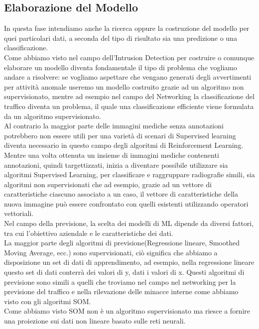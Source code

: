 \documentclass[../tesi.tex]{subfiles}
\begin{document}
\subsection{Elaborazione del Modello}
In questa fase intendiamo anche la ricerca oppure la costruzione del modello per quei particolari dati, a seconda del tipo di risultato sia una predizione o una classificazione.\\
Come abbiamo visto nel campo dell’Intrusion Detection per costruire o comunque elaborare un modello diventa fondamentale il tipo di problema che vogliamo andare a risolvere:
se vogliamo aspettare che vengano generati degli avvertimenti per attività anomale useremo un modello costruito grazie ad un algoritmo non supervisionato, mentre ad esempio nel campo del Networking la classificazione del traffico diventa un problema, il quale una classificazione efficiente viene formulata da un algoritmo supervisionato.\\
Al contrario la maggior parte delle immagini mediche senza annotazioni potrebbero non essere utili per una varietà di scenari di Supervised learning diventa necessario in questo campo degli algoritmi di Reinforcement Learning.\\
Mentre una volta ottenuta un insieme di immagini mediche contenenti annotazioni, quindi targettizzati, inizia a diventare possibile utilizzare sia algoritmi Supervised Learning, per classificare e raggruppare radiografie simili, sia algoritmi non supervisionati che ad esempio, grazie ad un vettore di caratteristiche ciascuno associato a un caso, il vettore di caratteristiche della nuova immagine può essere confrontato con quelli esistenti utilizzando operatori vettoriali.\\
Nel campo della previsione, la scelta dei modelli di ML dipende da diversi fattori, tra cui l’obiettivo aziendale e le caratteristiche dei dati.\\
La maggior parte degli algoritmi di previsione(Regressione lineare, Smoothed Moving Average, ecc.) sono supervisionati, ciò significa che abbiamo a disposizione un set di dati di apprendimento, ad esempio, nella regressione lineare questo set di dati conterrà dei valori di y, dati i valori di x. Questi algoritmi di previsione sono simili a quelli che troviamo nel campo nel networking per la previsione del traffico e nella rilevazione delle minacce interne come abbiamo visto con gli algoritmi SOM.\\
Come abbiamo visto SOM non è un algoritmo supervisionato ma riesce a fornire una proiezione sui dati non lineare basato sulle reti neurali.
\newpage
\end{document}
